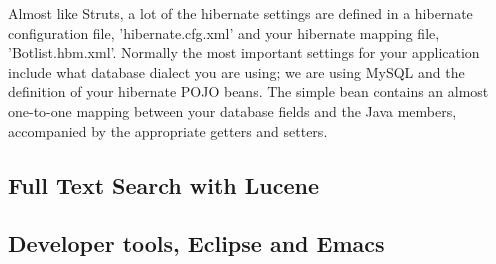Almost like Struts, a lot of the hibernate settings 
are defined in a hibernate configuration file, 'hibernate.cfg.xml' 
and your hibernate mapping file, 'Botlist.hbm.xml'. 
Normally the most important settings for your application 
include what database dialect you are using; we are using MySQL 
and the definition of your hibernate POJO beans. 
The simple bean contains an almost one-to-one mapping between 
your database fields and the Java members, accompanied by 
the appropriate getters and setters.

\subsection{Full Text Search with Lucene}

\subsection{Developer tools, Eclipse and Emacs}


